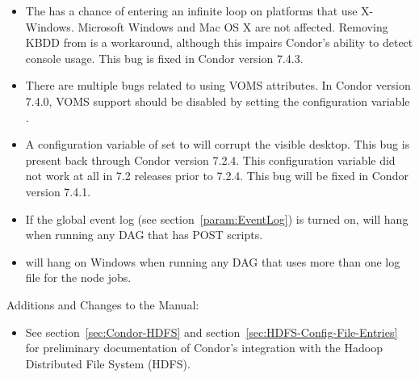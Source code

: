 \begin{itemize}

\item The  has a chance of entering an infinite loop
on platforms that use X-Windows.  Microsoft Windows and Mac OS X
are not affected.  Removing KBDD from  is a
workaround, although this impairs Condor's ability to detect
console usage.  This bug is fixed in Condor version 7.4.3.

\item There are multiple bugs related to using VOMS attributes.
In Condor version 7.4.0, VOMS support should be disabled by setting
the configuration variable .

\item A configuration variable of   set 
to  will corrupt the visible desktop.
  This bug is present back through Condor version 7.2.4.
This configuration variable did not work at all in 7.2 releases
prior to 7.2.4.  This bug will be fixed in Condor version 7.4.1.

\item If the global event log (see section~\ref{param:EventLog}) is
turned on,  will hang when running any DAG that has
POST scripts.

\item {} will hang on Windows when running any DAG that
uses more than one log file for the node jobs.

\end{itemize}

\noindent Additions and Changes to the Manual:

\begin{itemize}

\item See section~\ref{sec:Condor-HDFS} and 
section~\ref{sec:HDFS-Config-File-Entries} for preliminary documentation of
Condor's integration with the Hadoop Distributed File System (HDFS). 

\end{itemize}

